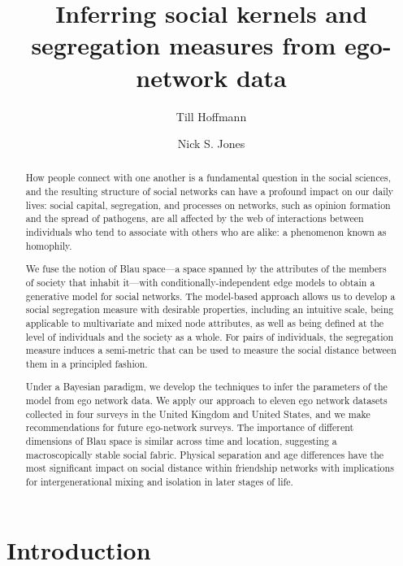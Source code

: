 \documentclass{scrartcl}
\title{Inferring social kernels and segregation measures from ego-network data}
\author{Till Hoffmann}
\author{Nick S. Jones}
\affil{Department of Mathematics, Imperial College London}
\date{}
\begin{document}
\maketitle

\begin{abstract} %
  How people connect with one another is a fundamental question in the social sciences, and the resulting structure of social networks can have a profound impact on our daily lives: social capital, segregation, and processes on networks, such as opinion formation and the spread of pathogens, are all affected by the web of interactions between individuals who tend to associate with others who are alike: a phenomenon known as homophily.

  We fuse the notion of Blau space---a space spanned by the attributes of the members of society that inhabit it---with conditionally-independent edge models to obtain a generative model for social networks. The model-based approach allows us to develop a social segregation measure with desirable properties, including an intuitive scale, being applicable to multivariate and mixed node attributes, as well as being defined at the level of individuals and the society as a whole. For pairs of individuals, the segregation measure induces a semi-metric that can be used to measure the social distance between them in a principled fashion.

  Under a Bayesian paradigm, we develop the techniques to infer the parameters of the model from ego network data. We apply our approach to eleven ego network datasets collected in four surveys in the United Kingdom and United States, and we make recommendations for future ego-network surveys. The importance of different dimensions of Blau space is similar across time and location, suggesting a macroscopically stable social fabric. Physical separation and age differences have the most significant impact on social distance within friendship networks with implications for intergenerational mixing and isolation in later stages of life.
\end{abstract}

\section{Introduction\label{sec:introduction}}
\end{document}
